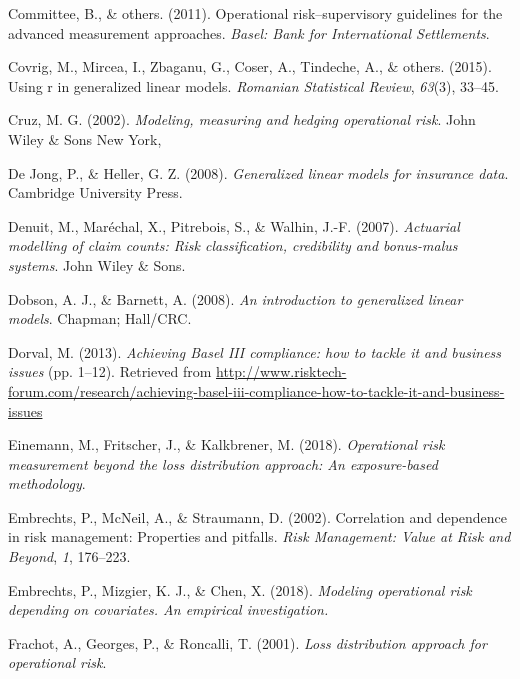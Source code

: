 \documentclass{DissertateUSU}
\begin{document}
\leavevmode\hypertarget{ref-basel2011operational}{}%
Committee, B., \& others. (2011). Operational risk--supervisory
guidelines for the advanced measurement approaches. \emph{Basel: Bank
for International Settlements}.

\leavevmode\hypertarget{ref-covrig2015using}{}%
Covrig, M., Mircea, I., Zbaganu, G., Coser, A., Tindeche, A., \& others.
(2015). Using r in generalized linear models. \emph{Romanian Statistical
Review}, \emph{63}(3), 33--45.

\leavevmode\hypertarget{ref-cruz2002modeling}{}%
Cruz, M. G. (2002). \emph{Modeling, measuring and hedging operational
risk}. John Wiley \& Sons New York,

\leavevmode\hypertarget{ref-de2008generalized}{}%
De Jong, P., \& Heller, G. Z. (2008). \emph{Generalized linear models
for insurance data}. Cambridge University Press.

\leavevmode\hypertarget{ref-denuit2007actuarial}{}%
Denuit, M., Maréchal, X., Pitrebois, S., \& Walhin, J.-F. (2007).
\emph{Actuarial modelling of claim counts: Risk classification,
credibility and bonus-malus systems}. John Wiley \& Sons.

\leavevmode\hypertarget{ref-dobson2008introduction}{}%
Dobson, A. J., \& Barnett, A. (2008). \emph{An introduction to
generalized linear models}. Chapman; Hall/CRC.

\leavevmode\hypertarget{ref-mysis2013}{}%
Dorval, M. (2013). \emph{Achieving Basel III compliance: how to tackle
it and business issues} (pp. 1--12). Retrieved from
\url{http://www.risktech-forum.com/research/achieving-basel-iii-compliance-how-to-tackle-it-and-business-issues}

\leavevmode\hypertarget{ref-einemann2018operational}{}%
Einemann, M., Fritscher, J., \& Kalkbrener, M. (2018). \emph{Operational
risk measurement beyond the loss distribution approach: An
exposure-based methodology}.

\leavevmode\hypertarget{ref-embrechts2002correlation}{}%
Embrechts, P., McNeil, A., \& Straumann, D. (2002). Correlation and
dependence in risk management: Properties and pitfalls. \emph{Risk
Management: Value at Risk and Beyond}, \emph{1}, 176--223.

\leavevmode\hypertarget{ref-embrechts2018modeling}{}%
Embrechts, P., Mizgier, K. J., \& Chen, X. (2018). \emph{Modeling
operational risk depending on covariates. An empirical investigation.}

\leavevmode\hypertarget{ref-frachot2001loss}{}%
Frachot, A., Georges, P., \& Roncalli, T. (2001). \emph{Loss
distribution approach for operational risk}.
\end{document}
